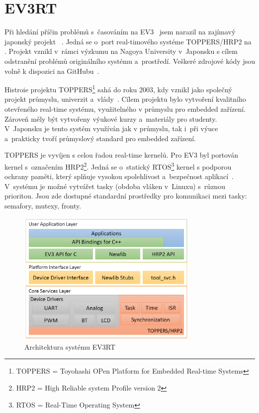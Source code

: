 \section{EV3RT}
\label{lego-EV3RT}

Při hledání příčin problémů s~časováním na EV3~\cite{legoMindstormsEV3_ev3dev-issue_constant-loop-time} jsem narazil na zajímavý japonský projekt \evRT{}~\cite{legoProgramingPlatform_EV3RT-git-web}.
Jedná se o~port real-timového systéme TOPPERS/HRP2 na \legoEV{}.
Projekt \evRT{} vznikl v~rámci výzkumu na Nagoya University v~Japonsku s cílem odstranění problémů originálního \lego{} systému a~prostředí. 
Veškeré zdrojové kódy jsou volně k dispozici na GitHubu~\cite{legoProgramingPlatform_EV3RT-github}. 

Histroie projektu TOPPERS\footnote{TOPPERS = Toyohashi OPen Platform for Embedded Real-time Systems} sahá do roku 2003, kdy vznikl jako společný projekt průmyslu, univerzit a~vlády~\cite{legoProgramingPlatform_TOPPERS}. 
Cílem projektu bylo vytvoření kvalitního otevřeného real-time systému, využitelného v průmyslu pro embedded zařízení. 
Zároveň měly být vytvořeny výukové kurzy a~materiály pro studenty.
V~Japonsku je tento systém využíván jak v průmyslu, tak i~při výuce a~prakticky tvoří průmyslový standard pro embedded zařízení. 

TOPPERS je vyvíjen s celou řadou real-time kernelů. Pro EV3 byl portován kernel s~označením HRP2\footnote{HRP2 = High Reliable system Profile version 2}.
Jedná se o~statický RTOS\footnote{RTOS = Real-Time Operating System} kernel s podporou ochrany paměti, který splňuje vysokou spolehlivost a~bezpečnost aplikací~\cite{legoProgramingPlatform_EV3RT-paper}.
V~systému je možné vytvářet tasky (obdoba vláken v~Linuxu) s~různou prioritou. 
Jsou zde dostupné standardní prostředky pro komunikaci mezi tasky: semafory, mutexy, fronty.

\begin{figure}[h]
	\centering
	\includegraphics[width=330px]{images/ev3rt-architecture.png}
	\caption[Architektura systému EV3RT]{Architektura systému EV3RT\protect\footnotemark}
	\label{ev3rt-architecture}
\end{figure}

